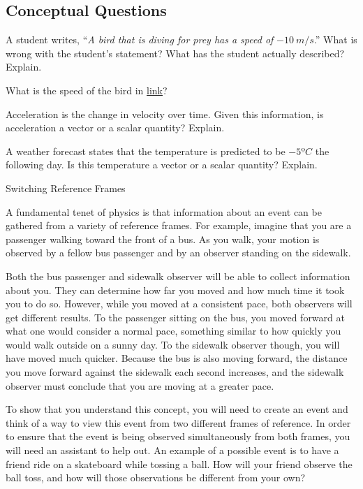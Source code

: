 \documentclass[
]{book}
\begin{document}
\hypertarget{fs-id1799980}{}
\hypertarget{conceptual-questions-1}{%
\subsection{Conceptual Questions}\label{conceptual-questions-1}}

\hypertarget{fs-id1364975}{}
\leavevmode{}%
A student writes, ``\emph{A bird that is diving for prey has a speed of}
\({- \textit{10}\ {m/s}}{}\).'' What is wrong with the student's
statement? What has the student actually described? Explain.

\hypertarget{fs-id1773292}{}
\leavevmode{}%
What is the speed of the bird in
\protect\hyperlink{fs-id1364975}{link}?

\hypertarget{fs-id1247502}{}
\leavevmode{}%
Acceleration is the change in velocity over time. Given this
information, is acceleration a vector or a scalar quantity? Explain.

\hypertarget{fs-id1548043}{}
\leavevmode{}%
A weather forecast states that the temperature is predicted to be
\({- 5ºC}{}\) the following day. Is this temperature a vector or a scalar
quantity? Explain.

\hypertarget{fs-id2066209}{}
Switching Reference Frames

A fundamental tenet of physics is that information about an event can be
gathered from a variety of reference frames. For example, imagine that
you are a passenger walking toward the front of a bus. As you walk, your
motion is observed by a fellow bus passenger and by an observer standing
on the sidewalk.

Both the bus passenger and sidewalk observer will be able to collect
information about you. They can determine how far you moved and how much
time it took you to do so. However, while you moved at a consistent
pace, both observers will get different results. To the passenger
sitting on the bus, you moved forward at what one would consider a
normal pace, something similar to how quickly you would walk outside on
a sunny day. To the sidewalk observer though, you will have moved much
quicker. Because the bus is also moving forward, the distance you move
forward against the sidewalk each second increases, and the sidewalk
observer must conclude that you are moving at a greater pace.

To show that you understand this concept, you will need to create an
event and think of a way to view this event from two different frames of
reference. In order to ensure that the event is being observed
simultaneously from both frames, you will need an assistant to help out.
An example of a possible event is to have a friend ride on a skateboard
while tossing a ball. How will your friend observe the ball toss, and
how will those observations be different from your own?
\end{document}
